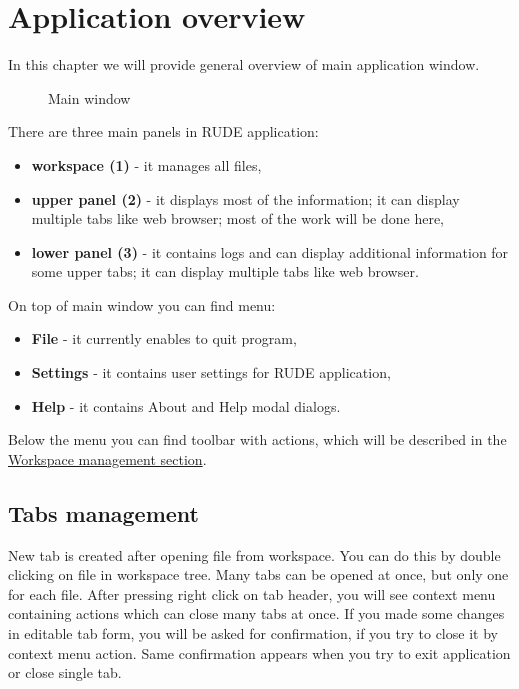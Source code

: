 \section{Application overview}\label{section:overview}

In this chapter we will provide general overview of main application window.

\begin{figure*}[!ht] 
	\centering
	\caption{Main window}
\end{figure*}

There are three main panels in RUDE application:
\begin{itemize}
	\item \textbf{workspace (1)} - it manages all files,
	\item \textbf{upper panel (2)} - it displays most of the information; it can display multiple tabs like web browser; most of the work will be done here,
	\item \textbf{lower panel (3)} - it contains logs and can display additional information for some upper tabs; it can display multiple tabs like web browser.
\end{itemize}

On top of main window you can find menu:
\begin{itemize}
	\item \textbf{File} - it currently enables to quit program,
	\item \textbf{Settings} - it contains user settings for RUDE application,
	\item \textbf{Help} - it contains About and Help modal dialogs.
\end{itemize}

Below the menu you can find toolbar with actions, which will be described in the \hyperref[section:workspace]{Workspace management section}.


\subsection{Tabs management}\label{sub:overview-tab}
New tab is created after opening file from workspace. You can do this by double clicking on file in workspace tree. Many tabs can be opened at once, but only one for each file. After pressing right click on tab header, you will see context menu containing actions which can close many tabs at once. If you made some changes in editable tab form, you will be asked for confirmation, if you try to close it by context menu action. Same confirmation appears when you try to exit application or close single tab.\\

